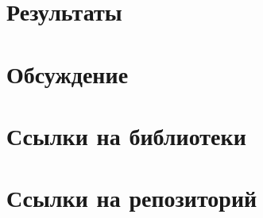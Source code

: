 \documentclass[14pt,a4paper,article]{ncc}
\begin{document}
\section{Результаты}


\newpage

\section{Обсуждение}

\newpage

\section{Ссылки на библиотеки}

\newpage

\section{Ссылки на репозиторий}

\end{document}
